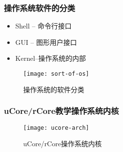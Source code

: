 %
%
%
%

\begin{frame}[plain]
	\frametitle{操作系统软件的分类}
		\begin{itemize}
		\item Shell -- 命令行接口
		\item GUI -- 图形用户接口
		\item Kernel--操作系统的内部
	\end{itemize}
	\begin{figure}
		\centering
		\texttt{[image: sort-of-os]}
		\caption{操作系统的软件分类}
	\end{figure}
\end{frame}

\begin{frame}[plain]
	\frametitle{uCore/rCore教学操作系统内核}
	\begin{figure}
		\centering
		\texttt{[image: ucore-arch]}
		\caption{uCore/rCore操作系统内核}
	\end{figure}
\end{frame}



